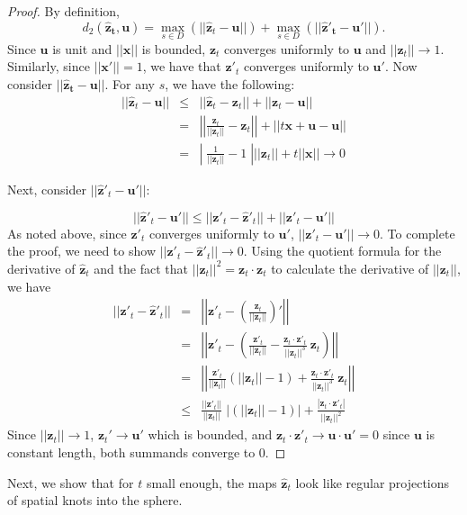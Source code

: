 \documentclass[12pt]{article}
\numberwithin{equation}{subsection}
\theoremstyle{definition}
\numberwithin{lem}{section}
\def\uu{\mathbf{u}}
\def\zz{\mathbf{z}}
\def\zhat{\mathbf{\hat{z}}}
\begin{document}
\begin{proof}
By definition,  
$$d_2(\mathbf{\hat{z}_t},\uu) = \max_{s \in D}(||\zhat_t - \uu||) + \max_{s \in D}(||\mathbf{\hat{z}'_t} - \uu'||).$$
Since $\uu$ is unit and $||\mathbf{x}||$ is bounded, $\zz_t $ converges uniformly to $\uu$ and $||\zz_t|| \to 1$.  Similarly, since $||\mathbf{x}'|| = 1$, we have that $\zz'_t $ converges uniformly to $\uu'$.  Now consider $||\mathbf{\hat{z}_t} - \uu||$. For any $s$,  we have the following:
\begin{eqnarray*}
||\zhat_t - \uu|| & \leq & ||\zhat_t - \zz_t|| + ||\zz_t - \uu||\\
& = & \left|\left|\frac{\zz_t}{||\zz_t||} - \zz_t\right|\right| + ||t\mathbf{x}+ \uu - \uu||\\
& = &\left\lvert \;\frac{1}{||\zz_t||} - 1 \;\right\rvert||\zz_t||  + t||\mathbf{x}|| \rightarrow  0
\end{eqnarray*}

\noindent Next, consider $||\zhat'_t - \uu'||$:

$$||\zhat'_t - \uu'|| \leq ||\zz'_t - \zhat'_t|| + ||\zz'_t - \uu'||$$
As noted above, since $\zz'_t $ converges uniformly to $\uu'$,  $||\zz'_t - \uu'|| \rightarrow 0$.  To complete the proof, we need to show  $||\zz'_t - \zhat'_t|| \to 0$.  Using the quotient formula for the derivative of $\zhat_t$ and the fact that $||\zz_t||^2 = \zz_t \cdot \zz_t$ to calculate the derivative of $||\zz_t||$, we have 
\begin{eqnarray*}
||\zz'_t - \zhat'_t|| & = & \left|\left| \zz'_t - \left(\frac{\zz_t}{||\zz_t||}\right)' \right|\right|\\
& = & \left|\left| \zz'_t - \left(\frac{\zz'_t}{||\zz_t||} - \frac{\zz_t \cdot \zz'_t}{||\zz_t||^3}\ \zz_t \right) \right|\right|\\
& = & \left|\left| \frac{\zz'_t}{||\zz_t||}\left(||\zz_t|| -1\right) + \frac{\zz_t \cdot \zz'_t}{||\zz_t||^3}\ \zz_t \right|\right|\\
& \leq & \frac{||\zz'_t||}{||\zz_t||}\;|\left(||\zz_t|| - 1\right)| + \frac{|\zz_t \cdot \zz'_t|}{||\zz_t||^2}
\end{eqnarray*}
Since $||\zz_t|| \rightarrow 1$, $\zz_t' \to \uu'$ which is bounded, and $\zz_t \cdot \zz'_t \rightarrow \uu\cdot \uu' = 0$ since $\uu$ is constant length, both summands converge to 0.
\end{proof}


Next, we show that for $t$ small enough,  the maps $\zhat_t$ look like regular projections of spatial knots into the sphere.
\end{document}
